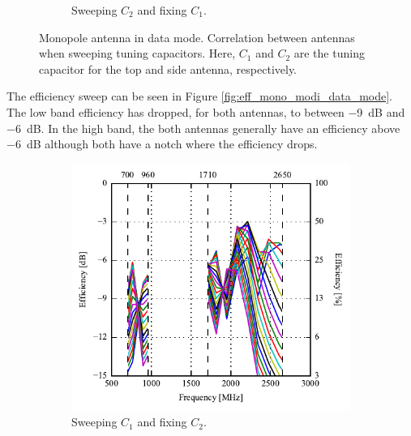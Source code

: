 \begin{figure}[htbp]
\begin{subfigure}{0.49\linewidth}
        \caption{Sweeping $C_2$ and fixing $C_1$.  }
    \end{subfigure}
    \caption{Monopole antenna in data mode. Correlation between antennas when sweeping tuning capacitors. Here, $C_1$ and $C_2$ are the tuning capacitor for the top and side antenna, respectively.}
    \label{fig:corr_mono_modi_data_mode}
\end{figure}


The efficiency sweep can be seen in Figure \ref{fig:eff_mono_modi_data_mode}. The low band efficiency has dropped, for both antennas, to between \SI{-9}{dB} and \SI{-6}{dB}. In the high band, the both antennas generally have an efficiency above \SI{-6}{dB} although both have a notch where the efficiency drops.

\begin{figure}[htbp]
    \centering
    \begin{subfigure}{0.49\linewidth}
        \includegraphics{img/tech_sol/monopole/highband/ue/datamode/eff_top.pdf}
        \caption{Sweeping $C_1$ and fixing $C_2$.}
    \end{subfigure}
    \hfill
    \begin{subfigure}{0.49\linewidth}

\end{subfigure}
\end{figure}

